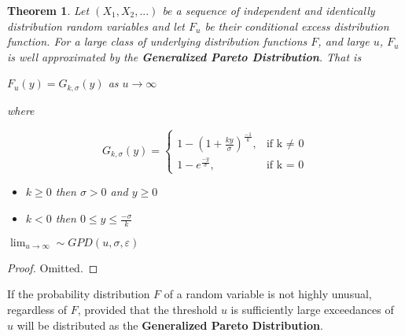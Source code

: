 \documentclass[11pt,a4paper]{article}
\theoremstyle{plain}
\newtheorem{thm}[fact]{Theorem}
\begin{document}
\begin{thm}
Let $(X_1,X_2,...)$ be a sequence of independent and identically distribution random variables and let $F_u$ be their conditional excess distribution function. For a large class of underlying distribution functions $F$, and large $u$, $F_u$ is well approximated by the \textbf{Generalized Pareto Distribution}. That is 
\begin{center}
$F_u(y)=G_{k,\sigma}(y)$ as $u\rightarrow \infty$
\end{center}

where
\begin{center}
 \[
     G_{k,\sigma}(y)=\left\{
                \begin{array}{ll}
                  1-(1+\frac{ky}{\sigma})^{\frac{-1}{k}},&\text{if k $\neq$ 0}\\
                  1-e^{\frac{-y}{\sigma}},&\text {if k = 0}
                \end{array}
              \right.
 \] 
 \end{center}
 \begin{itemize}
  \item $k \geq 0$ then $\sigma > 0$ and $y \geq 0$
  \item $k<0$ then $0 \leq y \leq \frac{-\sigma}{k}$

\end{itemize}

\begin{center}
$\lim_{u \rightarrow \infty} \sim GPD(u,\sigma,\varepsilon)$
\end{center}
\end{thm}

\begin{proof}
Omitted.
\end{proof}
If the probability distribution $F$ of a random variable is not highly unusual, regardless of $F$, provided that the threshold $u$ is sufficiently large exceedances of $u$ will be distributed as the \textbf{Generalized Pareto Distribution}.
\newpage
\end{document}
